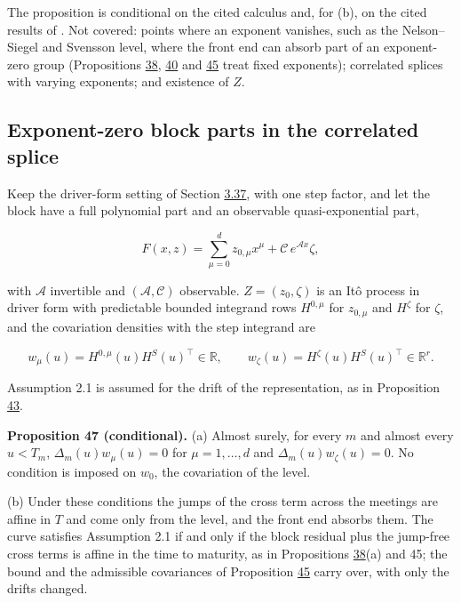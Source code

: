 \documentclass[11pt]{article}
\begin{document}
The proposition is conditional on the cited calculus and, for (b), on the cited results of \cite{filipovic2000exponential}. Not covered: points where an exponent vanishes, such as the Nelson--Siegel and Svensson level, where the front end can absorb part of an exponent-zero group (Propositions \hyperref[res:Proposition-38]{38}, \hyperref[res:Proposition-40]{40} and \hyperref[res:Proposition-45]{45} treat fixed exponents); correlated splices with varying exponents; and existence of \(Z\).

\subsection{Exponent-zero block parts in the correlated splice}\label{sec:3.41}

Keep the driver-form setting of Section \hyperref[sec:3.37]{3.37}, with one step factor, and let the block have a full polynomial part and an observable quasi-exponential part,

\begin{equation*}
F(x,z)=\sum_{\mu=0}^dz_{0,\mu}x^\mu+\mathcal C\,e^{\mathcal Ax}\zeta, \tag{3.178}\label{eq:3.178}
\end{equation*}

with \(\mathcal A\) invertible and \((\mathcal A,\mathcal C)\) observable. \(Z=(z_0,\zeta)\) is an Itô process in driver form with predictable bounded integrand rows \(H^{0,\mu}\) for \(z_{0,\mu}\) and \(H^\zeta\) for \(\zeta\), and the covariation densities with the step integrand are

\begin{equation*}
w_\mu(u)=H^{0,\mu}(u)H^S(u)^\top\in\mathbb R,\qquad w_\zeta(u)=H^\zeta(u)H^S(u)^\top\in\mathbb R^r. \tag{3.179}\label{eq:3.179}
\end{equation*}

Assumption 2.1 is assumed for the drift of the representation, as in Proposition \hyperref[res:Proposition-43]{43}.

\label{res:Proposition-47}
\textbf{Proposition 47 (conditional).} (a) Almost surely, for every \(m\) and almost every \(u<T_m\), \(\Delta_m(u)w_\mu(u)=0\) for \(\mu=1,\dots,d\) and \(\Delta_m(u)w_\zeta(u)=0\). No condition is imposed on \(w_0\), the covariation of the level.

(b) Under these conditions the jumps of the cross term across the meetings are affine in \(T\) and come only from the level, and the front end absorbs them. The curve satisfies Assumption 2.1 if and only if the block residual plus the jump-free cross terms is affine in the time to maturity, as in Propositions \hyperref[res:Proposition-38]{38}(a) and 45; the bound and the admissible covariances of Proposition \hyperref[res:Proposition-45]{45} carry over, with only the drifts changed.
\end{document}
